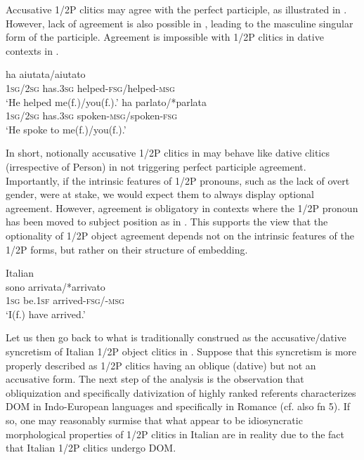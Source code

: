 \documentclass[output=paper]{langscibook}
\begin{document}
Accusative 1/2P clitics may agree with the perfect participle, as illustrated in . However, lack of agreement is also possible in , leading to the masculine singular form of the participle. Agreement is impossible with 1/2P clitics in dative contexts in .\\

\ea\label{ex:manzini:}
\begin{xlist}
\ex {}     {ha}     {aiutata/aiutato}\\
\textsc{1sg/2sg}  has\textsc{.3sg}    helped\textsc{{}-fsg/}helped\textsc{{}-msg}\\
\glt ‘He helped me(f.)/you(f.).’
\ex {}        {ha}     {parlato/*parlata}\\
\textsc{1sg/2sg}  has\textsc{.3sg}    spoken\textsc{{}-msg/}spoken\textsc{{}-fsg}\\
\glt ‘He spoke to me(f.)/you(f.).’
\end{xlist}
\z 

In short, notionally accusative 1/2P clitics in  may behave like dative clitics (irrespective of Person) in not triggering perfect participle agreement. Importantly, if the intrinsic features of 1/2P pronouns, such as the lack of overt gender, were at stake, we would expect them to always display optional agreement. However, agreement is obligatory in contexts where the 1/2P pronoun has been moved to subject position as in . This supports the view that the optionality of 1/2P object agreement depends not on the intrinsic features of the 1/2P forms, but rather on their structure of embedding.

\ea\label{ex:manzini:}
Italian\\
  {sono}     {arrivata/*arrivato}\\
\textsc{1sg}  be.\textsc{1sf}   arrived\textsc{{}-fsg/-msg}\\
\glt ‘I(f.) have arrived.’
\z

Let us then go back to what is traditionally construed as the accusative/dative syncretism of Italian 1/2P object clitics in .  Suppose that this syncretism is more properly described as 1/2P clitics having an oblique (dative) but not an accusative form. The next step of the analysis is the observation that obliquization and specifically dativization of highly ranked referents characterizes DOM in Indo-European languages and specifically in Romance (cf. also fn 5).  If so, one may reasonably surmise that what appear to be idiosyncratic morphological properties of 1/2P clitics in Italian are in reality due to the fact that Italian 1/2P clitics undergo DOM. 
\end{document}
